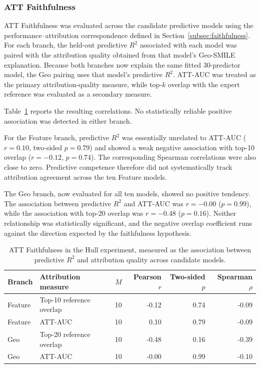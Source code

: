 
\subsubsection{ATT Faithfulness}
\label{sec:hull_faithfulness}

ATT Faithfulness was evaluated across the candidate predictive models using
the performance--attribution correspondence defined in
Section~\ref{subsec:faithfulness}. For each branch, the held-out predictive
$R^2$ associated with each model was paired with the attribution quality
obtained from that model's Geo-SMILE explanation. Because both branches now
explain the same fitted 30-predictor model, the Geo pairing uses that model's
predictive $R^2$. ATT-AUC was treated as the primary attribution-quality
measure, while top-$k$ overlap with the expert reference was evaluated as a
secondary measure.

Table~\ref{tab:hull_faithfulness_correlation} reports the resulting
correlations. No statistically reliable positive association was detected in
either branch.

For the Feature branch, predictive $R^2$ was essentially unrelated to
ATT-AUC ($r=0.10$, two-sided $p=0.79$) and showed a weak negative association
with top-10 overlap ($r=-0.12$, $p=0.74$). The corresponding Spearman
correlations were also close to zero. Predictive competence therefore did not
systematically track attribution agreement across the ten Feature models.

The Geo branch, now evaluated for all ten models, showed no positive
tendency. The association between predictive $R^2$ and ATT-AUC was
$r=-0.00$ ($p=0.99$), while the association with top-20 overlap was
$r=-0.48$ ($p=0.16$). Neither relationship was statistically significant, and
the negative overlap coefficient runs against the direction expected by the
faithfulness hypothesis.

\begin{table}[H]
\centering
\caption{ATT Faithfulness in the Hull experiment, measured as the association
between predictive $R^2$ and attribution quality across candidate models.}
\label{tab:hull_faithfulness_correlation}
\small
\begin{tabular}{llrrrr}
\toprule
Branch & Attribution measure & $M$ & Pearson $r$ &
Two-sided $p$ & Spearman $\rho$ \\
\midrule
Feature & Top-10 reference overlap & 10 & -0.12 & 0.74 & -0.09 \\
Feature & ATT-AUC                  & 10 &  0.10 & 0.79 & -0.09 \\
Geo     & Top-20 reference overlap & 10 & -0.48 & 0.16 & -0.39 \\
Geo     & ATT-AUC                  & 10 & -0.00 & 0.99 & -0.10 \\
\bottomrule
\end{tabular}
\end{table}

